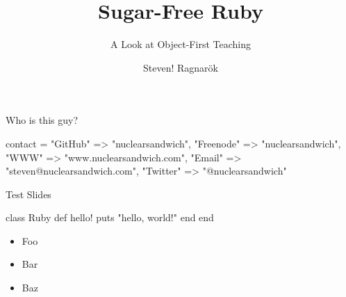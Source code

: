 \documentclass[20pt,draft]{beamer}
\author{Steven! Ragnarök}
\title{Sugar-Free Ruby}
\subtitle{A Look at Object-First Teaching}
\date{}
\begin{document}
\begin{frame}
	\titlepage
\end{frame}

\begin{frame}[fragile]
	\begin{center}
		{
			Who is this guy?
		}

		\vspace{1cm}

			\insertauthor

	\end{center}

\begin{ruby10pt}
contact = {
  "GitHub"   =>        "nuclearsandwich",
  "Freenode" =>        "nuclearsandwich",
  "WWW"      =>    "www.nuclearsandwich.com",
  "Email"    => "steven@nuclearsandwich.com",
  "Twitter"  =>       "@nuclearsandwich"
}
\end{ruby10pt}
\end{frame}

\begin{section}{Test Slides}
\begin{frame}[fragile]
\begin{rubycode}
class Ruby
  def hello!
    puts "hello, world!"
  end
end
\end{rubycode}
\end{frame}

\begin{frame}
	\begin{itemize}
		\item Foo
		\item Bar
		\item Baz
	\end{itemize}
\end{frame}
\end{section}
\end{document}
